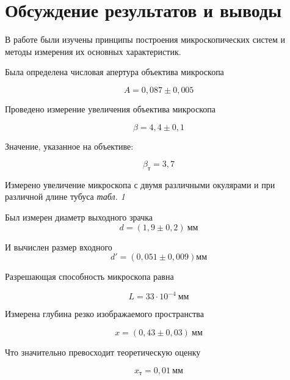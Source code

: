 \documentclass[a4paper, 12pt]{article}
\begin{document}
\section{Обсуждение результатов и выводы}
В работе были изучены принципы построения микроскопических систем и
методы измерения их основных характеристик.

Была определена числовая апертура объектива микроскопа 

\[
    A = 0,087 \pm 0,005
\]

Проведено измерение увеличения объектива микроскопа 

\[
    \beta = 4,4 \pm 0,1
\]

Значение, указанное на объективе:

\[
    \beta_\text{т} = 3,7
\]

Измерено увеличение микроскопа с двумя различными окулярами и при
различной длине тубуса \textsl{табл. 1}

Был измерен диаметр выходного зрачка 
\[
    d = (1,9\pm 0,2)\ \text{мм}
\]

И вычислен размер входного 
\[
    d' = (0,051 \pm 0,009) \text{мм}
\]

Разрешающая способность микроскопа равна

\[
    L = 33 \cdot 10^{-4}\ \text{мм}
\]

Измерена глубина резко изображаемого пространства

\[
    x = (0,43\pm 0,03)\ \text{мм}
\]

Что значительно превосходит теоретическую оценку

\[
    x_\text{т} = 0,01\ \text{мм}
\]
\end{document}
